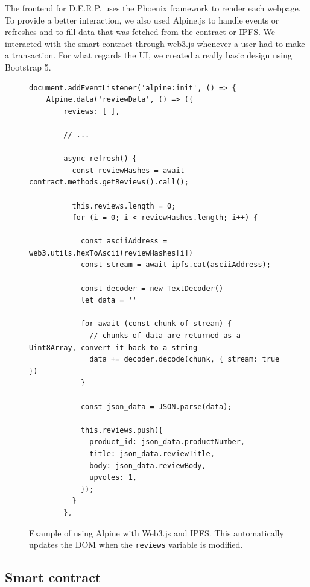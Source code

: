 \documentclass[12pt,a4paper,oneside]{article}
\theoremstyle{definition}
\begin{document}
The frontend for D.E.R.P. uses the Phoenix framework to render each webpage. To provide a better interaction, we also used Alpine.js  to handle events or refreshes and to fill data that was fetched from the contract or IPFS. We interacted with the smart contract through web3.js whenever a user had to make a transaction. For what regards the UI, we created a really basic design using Bootstrap 5.

\begin{figure}[H]
	\begin{verbatim}
document.addEventListener('alpine:init', () => {
    Alpine.data('reviewData', () => ({
        reviews: [ ],

        // ...

        async refresh() {
          const reviewHashes = await contract.methods.getReviews().call();

          this.reviews.length = 0;
          for (i = 0; i < reviewHashes.length; i++) {

            const asciiAddress = web3.utils.hexToAscii(reviewHashes[i])
            const stream = await ipfs.cat(asciiAddress);

            const decoder = new TextDecoder()
            let data = ''

            for await (const chunk of stream) {
              // chunks of data are returned as a Uint8Array, convert it back to a string
              data += decoder.decode(chunk, { stream: true })
            }

            const json_data = JSON.parse(data);

            this.reviews.push({
              product_id: json_data.productNumber,
              title: json_data.reviewTitle,
              body: json_data.reviewBody,
              upvotes: 1,
            });
          }
        },
    \end{verbatim}
	\label{code:js-alpine}
	\caption{Example of using Alpine with Web3.js and IPFS. This automatically updates the DOM when the \texttt{reviews} variable is modified.}
\end{figure}

\subsection{Smart contract}
\end{document}

